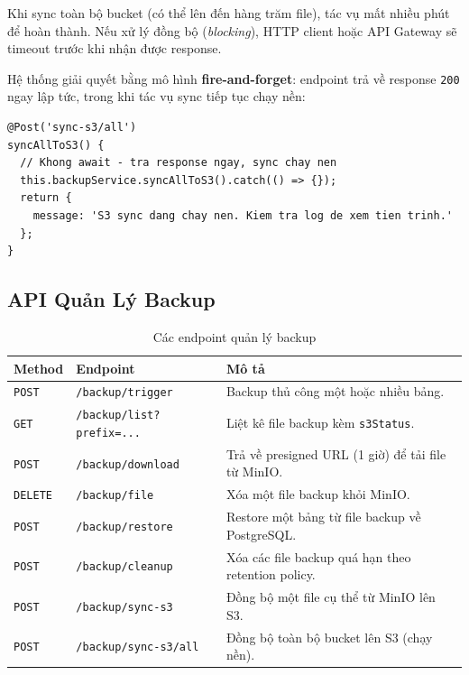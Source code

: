 Khi sync toàn bộ bucket (có thể lên đến hàng trăm file), tác vụ mất nhiều
phút để hoàn thành. Nếu xử lý đồng bộ (\textit{blocking}), HTTP client hoặc
API Gateway sẽ timeout trước khi nhận được response.

Hệ thống giải quyết bằng mô hình \textbf{fire-and-forget}: endpoint trả về
response \texttt{200} ngay lập tức, trong khi tác vụ sync tiếp tục chạy nền:

\begin{lstlisting}[caption={Fire-and-forget cho sync-s3/all}]
@Post('sync-s3/all')
syncAllToS3() {
  // Khong await - tra response ngay, sync chay nen
  this.backupService.syncAllToS3().catch(() => {});
  return {
    message: 'S3 sync dang chay nen. Kiem tra log de xem tien trinh.'
  };
}
\end{lstlisting}

\subsection{API Quản Lý Backup}

\begin{table}[H]
\centering
\caption{Các endpoint quản lý backup}
\label{tab:backup-api}
\renewcommand{\arraystretch}{1.4}
\begin{tabular}{|l|l|p{5.5cm}|}
\hline
\textbf{Method} & \textbf{Endpoint} & \textbf{Mô tả} \\
\hline
\texttt{POST} & \texttt{/backup/trigger}
    & Backup thủ công một hoặc nhiều bảng. \\
\hline
\texttt{GET} & \texttt{/backup/list?prefix=...}
    & Liệt kê file backup kèm \texttt{s3Status}. \\
\hline
\texttt{POST} & \texttt{/backup/download}
    & Trả về presigned URL (1 giờ) để tải file từ MinIO. \\
\hline
\texttt{DELETE} & \texttt{/backup/file}
    & Xóa một file backup khỏi MinIO. \\
\hline
\texttt{POST} & \texttt{/backup/restore}
    & Restore một bảng từ file backup về PostgreSQL. \\
\hline
\texttt{POST} & \texttt{/backup/cleanup}
    & Xóa các file backup quá hạn theo retention policy. \\
\hline
\texttt{POST} & \texttt{/backup/sync-s3}
    & Đồng bộ một file cụ thể từ MinIO lên S3. \\
\hline
\texttt{POST} & \texttt{/backup/sync-s3/all}
    & Đồng bộ toàn bộ bucket lên S3 (chạy nền). \\
\hline
\end{tabular}
\end{table}

